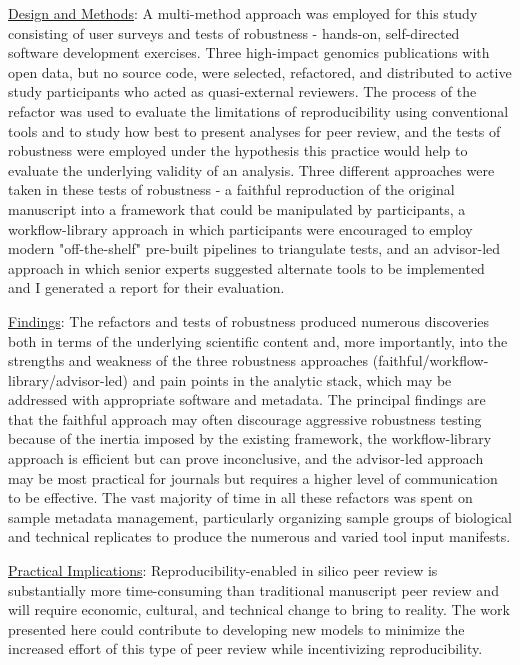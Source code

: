 \documentclass{drexelthesis}
\begin{document}
\uline{Design and Methods}: A multi-method approach was employed for this study consisting of user surveys and tests of robustness - hands-on, self-directed software development exercises. Three high-impact genomics publications with open data, but no source code, were selected, refactored, and distributed to active study participants who acted as quasi-external reviewers. The process of the refactor was used to evaluate the limitations of reproducibility using conventional tools and to study how best to present analyses for peer review, and the tests of robustness were employed under the hypothesis this practice would help to evaluate the underlying validity of an analysis. Three different approaches were taken in these tests of robustness - a faithful reproduction of the original manuscript into a framework that could be manipulated by participants, a workflow-library approach in which participants were encouraged to employ modern "off-the-shelf" pre-built pipelines to triangulate tests, and an advisor-led approach in which senior experts suggested alternate tools to be implemented and I generated a report for their evaluation. 

\uline{Findings}: The refactors and tests of robustness produced numerous discoveries both in terms of the underlying scientific content and, more importantly, into the strengths and weakness of the three robustness approaches (faithful/workflow-library/advisor-led) and pain points in the analytic stack, which may be addressed with appropriate software and metadata. The principal findings are that the faithful approach may often discourage aggressive robustness testing because of the inertia imposed by the existing framework, the workflow-library approach is efficient but can prove inconclusive, and the advisor-led approach may be most practical for journals but requires a higher level of communication to be effective. The vast majority of time in all these refactors was spent on sample metadata management, particularly organizing sample groups of biological and technical replicates to produce the numerous and varied tool input manifests. 

\uline{Practical Implications}: Reproducibility-enabled in silico peer review is substantially more time-consuming than traditional manuscript peer review and will require economic, cultural, and technical change to bring to reality. The work presented here could contribute to developing new models to minimize the increased effort of this type of peer review while incentivizing reproducibility.
\end{document}
